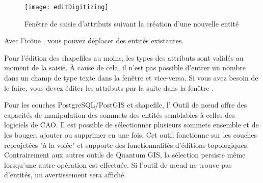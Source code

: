 \begin{figure}[ht]
  \begin{center}
   \texttt{[image: editDigitizing]}
  \caption{Fenêtre de saisie d'attributs suivant la création d'une nouvelle entité \nixcaption}\label{fig:vector_digitising}
\end{center}
\end{figure}

Avec l'icône , vous pouvez déplacer des entités existantes.

\begin{Tip}[ht]\caption{\textsc{Types des valeurs d'attribut}}
Pour l'édition des shapefiles au moins, les types des attributs sont validés au moment de la saisie. À cause de cela, il n'est pas possible d'entrer un nombre dans un champ de type texte dans la fenêtre  et vice-versa. Si vous avez besoin de le faire, vous devez éditer les attributs par la suite dans la fenêtre .
\end{Tip}



Pour les couches PostgreSQL/PostGIS et shapefile, l'
{Outil de nœud} offre des capacités de manipulation des sommets des entités 
semblables à celles des logiciels de CAO. Il est possible de sélectionner 
plusieurs sommets ensemble et de les bouger, ajouter ou supprimer en une fois. 
Cet outil fonctionne sur les couches reprojetées "à la volée" et supporte des 
fonctionnalités d'éditions topologiques. Contrairement aux autres outils de 
Quantum GIS, la sélection persiste même lorsqu’une autre opération est effectuée. 
Si l'outil de nœud ne trouve pas d'entités, un avertissement sera affiché.

